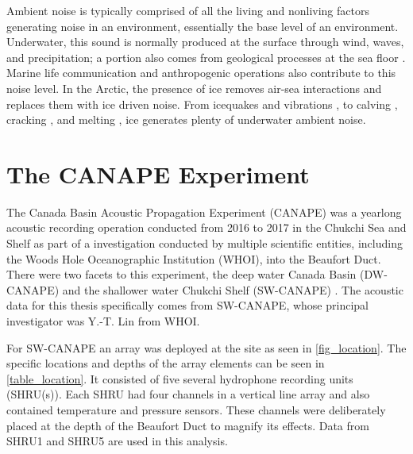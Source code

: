 Ambient noise is typically comprised of all the living and nonliving factors generating noise in an environment, essentially the base level of an environment. Underwater, this sound is normally produced at the surface through wind, waves, and precipitation; a portion also comes from geological processes at the sea floor \parencite{dziak2015sources}. Marine life communication \parencite{ladegaard2021} and anthropogenic operations also contribute to this noise level. In the Arctic, the presence of ice removes air-sea interactions and replaces them with ice driven noise. From icequakes \parencite{muller2005singing} and vibrations \parencite{kinda2015arctic}, to calving \parencite{matsumoto2014antarctic}, cracking \parencite{milne1964ambient}, and melting     \parencite{glowacki2018intensity} \parencite{mahanty2020melt}, ice generates plenty of underwater ambient noise. 

\section{The CANAPE Experiment} \label{intro_canape}

The Canada Basin Acoustic Propagation Experiment (CANAPE) was a yearlong acoustic recording operation conducted from 2016 to 2017 in the Chukchi Sea and Shelf as part of a investigation conducted by multiple scientific entities, including the Woods Hole Oceanographic Institution (WHOI), into the Beaufort Duct. There were two facets to this experiment, the deep water Canada Basin (DW-CANAPE) and the shallower water Chukchi Shelf (SW-CANAPE) \parencite{ballard2020yearlong}. The acoustic data for this thesis specifically comes from SW-CANAPE, whose principal investigator was Y.-T. Lin from WHOI. %

For SW-CANAPE an array was deployed at the site as seen in \autoref{fig_location}. The specific locations and depths of the array elements can be seen in \autoref{table_location}. It consisted of five several hydrophone recording units (SHRU(s)). Each SHRU had four channels in a vertical line array and also contained temperature and pressure sensors. These channels were deliberately placed at the depth of the Beaufort Duct to magnify its effects. Data from SHRU1 and SHRU5 are used in this analysis.

